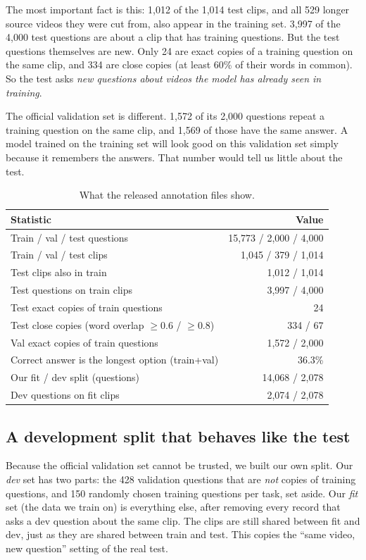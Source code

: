 The most important fact is this: 1,012 of the 1,014 test clips, and all 529
longer source videos they were cut from, also appear in the training set.
3,997 of the 4,000 test questions are about a clip that has training
questions. But the test questions themselves are new. Only 24 are exact
copies of a training question on the same clip, and 334 are close copies
(at least 60\% of their words in common). So the test asks \emph{new
questions about videos the model has already seen in training}.

The official validation set is different. 1,572 of its 2,000 questions
repeat a training question on the same clip, and 1,569 of those have the
same answer. A model trained on the training set will look good on
this validation set simply because it remembers the answers. That number
would tell us little about the test.

\begin{table}[t]
\centering
\caption{What the released annotation files show.}
\label{tab:audit}
\footnotesize
\begin{tabular}{@{}lr@{}}
\toprule
Statistic & Value \\
\midrule
Train / val / test questions & 15,773 / 2,000 / 4,000 \\
Train / val / test clips & 1,045 / 379 / 1,014 \\
Test clips also in train & 1,012 / 1,014 \\
Test questions on train clips & 3,997 / 4,000 \\
Test exact copies of train questions & 24 \\
Test close copies (word overlap $\geq 0.6$ / $\geq 0.8$) & 334 / 67 \\
Val exact copies of train questions & 1,572 / 2,000 \\
Correct answer is the longest option (train+val) & 36.3\% \\
\midrule
Our fit / dev split (questions) & 14,068 / 2,078 \\
Dev questions on fit clips & 2,074 / 2,078 \\
\bottomrule
\end{tabular}
\end{table}

\subsection{A development split that behaves like the test}
Because the official validation set cannot be trusted, we built our own
split. Our \emph{dev} set has two parts: the 428 validation questions that
are \emph{not} copies of training questions, and 150 randomly chosen
training questions per task, set aside. Our \emph{fit} set (the data we
train on) is everything else, after removing every record that asks a dev
question about the same clip. The clips are still shared between fit and
dev, just as they are shared between train and test. This copies the
``same video, new question'' setting of the real test.

